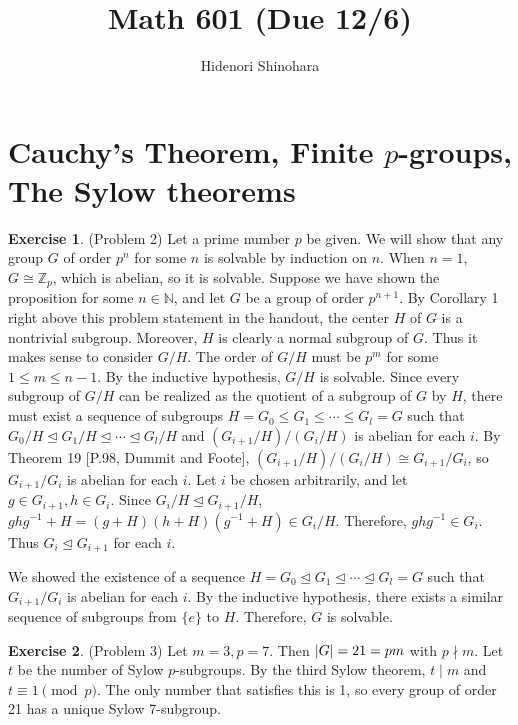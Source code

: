 \documentclass[12pt, psamsfonts]{amsart}
\theoremstyle{definition}
\newtheorem*{exer}{Exercise}
\theoremstyle{remark}
\numberwithin{equation}{section}
\begin{document}
\title{Math 601 (Due 12/6)}
\author{Hidenori Shinohara}
\maketitle

\tableofcontents

\section{Cauchy's Theorem, Finite $p$-groups, The Sylow theorems}

\begin{exer}{(Problem 2)}
  Let a prime number $p$ be given.
  We will show that any group $G$ of order $p^n$ for some $n$ is solvable by induction on $n$.
  When $n = 1$, $G \cong \mathbb{Z}_p$, which is abelian, so it is solvable.
  Suppose we have shown the proposition for some $n \in \mathbb{N}$, and let $G$ be a group of order $p^{n + 1}$.
  By Corollary 1 right above this problem statement in the handout, the center $H$ of $G$ is a nontrivial subgroup.
  Moreover, $H$ is clearly a normal subgroup of $G$.
  Thus it makes sense to consider $G / H$.
  The order of $G / H$ must be $p^m$ for some $1 \leq m \leq n - 1$.
  By the inductive hypothesis, $G / H$ is solvable.
  Since every subgroup of $G / H$ can be realized as the quotient of a subgroup of $G$ by $H$, there must exist a sequence of subgroups $H = G_0 \leq G_1 \leq \cdots \leq G_l = G$ such that $G_0 / H \trianglelefteq G_1 / H \trianglelefteq \cdots \trianglelefteq G_l / H$ and $(G_{i + 1} / H) / (G_{i} / H)$ is abelian for each $i$.
  By Theorem 19 [P.98, Dummit and Foote], $(G_{i + 1} / H) / (G_{i} / H) \cong G_{i + 1} / G_{i}$, so $G_{i + 1} / G_i$ is abelian for each $i$.
  Let $i$ be chosen arbitrarily, and let $g \in G_{i + 1}, h \in G_i$.
  Since $G_i / H \trianglelefteq G_{i + 1} / H$, $ghg^{-1} + H = (g + H)(h + H)(g^{-1} + H) \in G_i / H$.
  Therefore, $ghg^{-1} \in G_i$.
  Thus $G_i \trianglelefteq G_{i + 1}$ for each $i$.

  We showed the existence of a sequence $H = G_0 \trianglelefteq G_1 \trianglelefteq \cdots \trianglelefteq G_l = G$ such that $G_{i + 1} / G_i$ is abelian for each $i$.
  By the inductive hypothesis, there exists a similar sequence of subgroups from $\{ e \}$ to $H$.
  Therefore, $G$ is solvable.
\end{exer}

\begin{exer}{(Problem 3)}
  Let $m = 3, p = 7$.
  Then $\abs{G} = 21 = pm$ with $p \nmid m$.
  Let $t$ be the number of Sylow $p$-subgroups.
  By the third Sylow theorem, $t \mid m$ and $t \equiv 1 \pmod p$.
  The only number that satisfies this is 1, so every group of order 21 has a unique Sylow 7-subgroup.
\end{exer}
\end{document}
